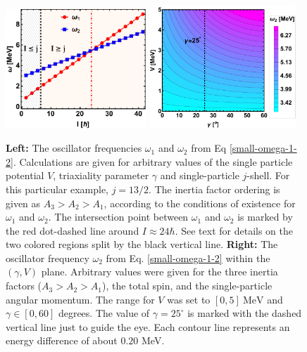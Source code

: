 \begin{figure}
    \centering
    \includegraphics[width=0.47\textwidth]{Chapters/Figures/omega-1-2-frequencies-1.pdf}
    \includegraphics[width=0.49\textwidth]{Chapters/Figures/omega-2-gamma-V.pdf}
    \caption{\textbf{Left:} The oscillator frequencies $\omega_1$ and $\omega_2$ from Eq \ref{small-omega-1-2}. Calculations are given for arbitrary values of the single particle potential $V$, triaxiality parameter $\gamma$ and single-particle $j$-shell. For this particular example, $j=13/2$. The inertia factor ordering is given as $A_3>A_2>A_1$, according to the conditions of existence for $\omega_1$ and $\omega_2$. The intersection point between $\omega_1$ and $\omega_2$ is marked by the red dot-dashed line around $I\approx 24\hbar$. See text for details on the two colored regions split by the black vertical line. \textbf{Right:} The oscillator frequency $\omega_2$ from Eq. \ref{small-omega-1-2} within the $(\gamma,V)$ plane. Arbitrary values were given for the three inertia factors ($A_3>A_2>A_1$), the total spin, and the single-particle angular momentum. The range for $V$ was set to $[0,5]\ \text{MeV}$ and $\gamma\in[0,60]$ degrees. The value of $\gamma=25^\circ$ is marked with the dashed vertical line just to guide the eye. Each contour line represents an energy difference of about $0.20$ MeV.}
    \label{fig-omega1-omega2-cp-omega2}
\end{figure}

